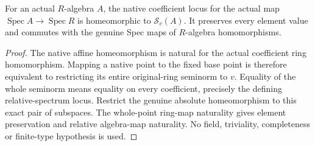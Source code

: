 \begin{theorem}
\label{scheme:relative-affine-valued-point-homeomorphism}
\leanok
{}
For an actual $R$-algebra $A$, the native coefficient locus for the actual
map $\operatorname{Spec}A\to\operatorname{Spec}R$ is homeomorphic to
$\mathcal S_v(A)$. It preserves every element value and commutes with
the genuine Spec maps of $R$-algebra homomorphisms.
\end{theorem}
\begin{proof}
The native affine homeomorphism is natural for the actual coefficient ring
homomorphism. Mapping a native point to the fixed base point is therefore
equivalent to restricting its entire original-ring seminorm to $v$.
Equality of the whole seminorm means equality on every coefficient, precisely
the defining relative-spectrum locus. Restrict the genuine absolute
homeomorphism to this exact pair of subspaces. The whole-point ring-map
naturality gives element preservation and relative algebra-map naturality.
No field, triviality, completeness or finite-type hypothesis is used.
\end{proof}

